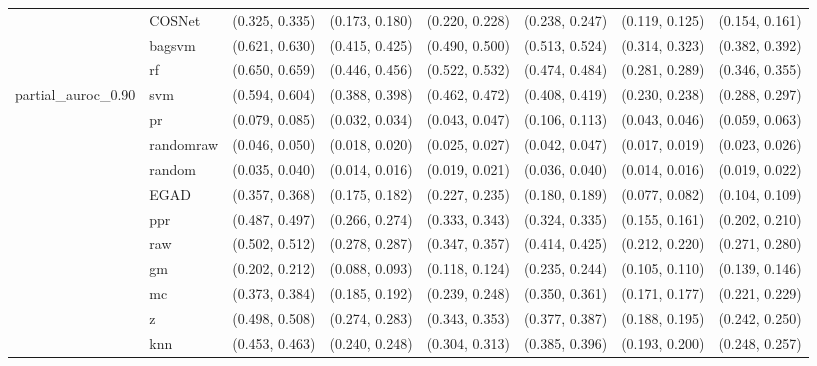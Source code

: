 \begin{table}[H]
{\begin{tabular}{llllllll}
 & COSNet & (0.325, 0.335) & (0.173, 0.180) & (0.220, 0.228) & (0.238, 0.247) & (0.119, 0.125) & (0.154, 0.161)\\

 & bagsvm & (0.621, 0.630) & (0.415, 0.425) & (0.490, 0.500) & (0.513, 0.524) & (0.314, 0.323) & (0.382, 0.392)\\

 & rf & (0.650, 0.659) & (0.446, 0.456) & (0.522, 0.532) & (0.474, 0.484) & (0.281, 0.289) & (0.346, 0.355)\\

\multirow{-15}{*}{\raggedright\arraybackslash partial\_auroc\_0.90} & svm & (0.594, 0.604) & (0.388, 0.398) & (0.462, 0.472) & (0.408, 0.419) & (0.230, 0.238) & (0.288, 0.297)\\
\cmidrule{1-8}
 & pr & (0.079, 0.085) & (0.032, 0.034) & (0.043, 0.047) & (0.106, 0.113) & (0.043, 0.046) & (0.059, 0.063)\\

 & randomraw & (0.046, 0.050) & (0.018, 0.020) & (0.025, 0.027) & (0.042, 0.047) & (0.017, 0.019) & (0.023, 0.026)\\

 & random & (0.035, 0.040) & (0.014, 0.016) & (0.019, 0.021) & (0.036, 0.040) & (0.014, 0.016) & (0.019, 0.022)\\

 & EGAD & (0.357, 0.368) & (0.175, 0.182) & (0.227, 0.235) & (0.180, 0.189) & (0.077, 0.082) & (0.104, 0.109)\\

 & ppr & (0.487, 0.497) & (0.266, 0.274) & (0.333, 0.343) & (0.324, 0.335) & (0.155, 0.161) & (0.202, 0.210)\\

 & raw & (0.502, 0.512) & (0.278, 0.287) & (0.347, 0.357) & (0.414, 0.425) & (0.212, 0.220) & (0.271, 0.280)\\

 & gm & (0.202, 0.212) & (0.088, 0.093) & (0.118, 0.124) & (0.235, 0.244) & (0.105, 0.110) & (0.139, 0.146)\\

 & mc & (0.373, 0.384) & (0.185, 0.192) & (0.239, 0.248) & (0.350, 0.361) & (0.171, 0.177) & (0.221, 0.229)\\

 & z & (0.498, 0.508) & (0.274, 0.283) & (0.343, 0.353) & (0.377, 0.387) & (0.188, 0.195) & (0.242, 0.250)\\

 & knn & (0.453, 0.463) & (0.240, 0.248) & (0.304, 0.313) & (0.385, 0.396) & (0.193, 0.200) & (0.248, 0.257)\\


\end{tabular}}
\end{table}

